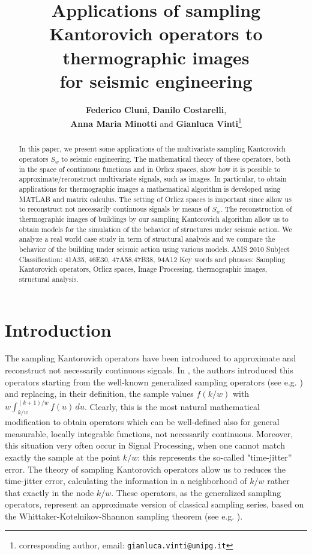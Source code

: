 \documentclass[11pt,a4paper]{article}
\title{{\bf Applications of sampling Kantorovich operators to thermographic images\\ for seismic engineering}}
\author{{\bf Federico Cluni}, \hskip0.5cm {\bf Danilo Costarelli},\\
 {\bf Anna Maria Minotti} \hskip0.3cm and \hskip0.3cm {\bf Gianluca Vinti}\thanks{corresponding author, email: {\tt gianluca.vinti@unipg.it}}}
\date{}
\begin{document}
\maketitle

\begin{abstract}
In this paper, we present some applications of the multivariate sampling Kantorovich operators $S_w$ to seismic engineering. The mathematical theory of these operators, both in the space of continuous functions and in Orlicz spaces, show how it is possible to approximate/reconstruct multivariate signals, such as images. In particular, to obtain applications for thermographic images a mathematical algorithm is developed using MATLAB and matrix calculus. The setting of Orlicz spaces is important since allow us to reconstruct not necessarily continuous signals by means of $S_w$. The reconstruction of thermographic images of buildings by our sampling Kantorovich algorithm allow us to obtain models for the simulation of the behavior of structures under seismic action. We analyze a real world case study in term of structural analysis and we compare the behavior of the building under seismic action using various models.
\vskip0.15cm
\noindent
  {\footnotesize AMS 2010 Subject Classification: 41A35, 46E30, 47A58,47B38, 94A12}
\vskip0.1cm
\noindent
  {\footnotesize Key words and phrases:  Sampling Kantorovich operators, Orlicz spaces, Image Processing, thermographic images, structural analysis.} 
\end{abstract}




\section{Introduction}

The sampling Kantorovich operators have been introduced to approximate and reconstruct not necessarily continuous signals. In \cite{BABUSTVI}, the authors introduced this operators starting from the well-known generalized sampling operators (see e.g. \cite{BUFIST,BUST2,BAVI2,VI1,BABUSTVI2}) and replacing, in their definition, the sample values $f(k/w)$ with $w \int_{k/w}^{(k+1)/w}f(u)\,du$. Clearly, this is the most natural mathematical modification to obtain operators which can be well-defined also for general measurable, locally integrable functions, not necessarily continuous. Moreover, this situation very often occur in Signal Processing, when one cannot match exactly the sample at the point $k/w$: this represents the so-called "time-jitter'' error. The theory of sampling Kantorovich operators allow us to reduces the time-jitter error, calculating the information in a neighborhood of $k/w$ rather that exactly in the node $k/w$. These operators, as the generalized sampling operators, represent an approximate version of classical sampling series, based on the Whittaker-Kotelnikov-Shannon sampling theorem (see e.g. \cite{ANVI}).
\end{document}
